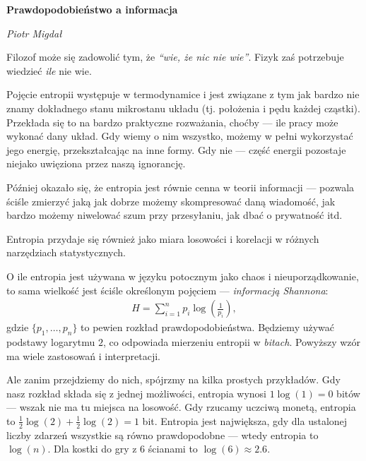 \documentclass[10pt,a4paper]{article}
\begin{document}
\noindent\textbf{\LARGE Prawdopodobieństwo a informacja}

\medskip
\noindent\textit{\Large Piotr Migdał}

\medskip

Filozof może się zadowolić tym, że \emph{``wie, że nic nie wie''}.
Fizyk zaś potrzebuje wiedzieć \emph{ile} nie wie.

Pojęcie entropii występuje w termodynamice i jest związane z tym jak bardzo nie znamy dokładnego stanu mikrostanu układu (tj. położenia i pędu każdej cząstki).
Przekłada się to na bardzo praktyczne rozważania, choćby --- ile pracy może wykonać dany układ. Gdy wiemy o nim wszystko, możemy w pełni wykorzystać jego energię, przekształcając na inne formy.
Gdy nie --- część energii pozostaje niejako uwięziona przez naszą ignorancję.

Później okazało się, że entropia jest równie cenna w teorii informacji --- pozwala ściśle zmierzyć jaką jak dobrze możemy skompresować daną wiadomość, jak bardzo możemy niwelować szum przy przesyłaniu, jak dbać o prywatność itd.

Entropia przydaje się również jako miara losowości i korelacji w różnych narzędziach statystycznych.


O ile entropia jest używana w języku potocznym jako chaos i nieuporządkowanie, to sama wielkość jest ściśle określonym pojęciem --- \emph{informacją Shannona}:
%
%
\begin{align}
    H = \sum_{i=1}^{n} p_i \log \left(\tfrac{1}{p_i} \right),\label{eq:entropia}
\end{align}
%
%
gdzie $\{p_1, \ldots, p_n\}$ to pewien rozkład prawdopodobieństwa.
Będziemy używać podstawy logarytmu $2$, co odpowiada mierzeniu entropii w \emph{bitach}.
Powyższy wzór ma wiele zastosowań i interpretacji.

Ale zanim przejdziemy do nich, spójrzmy na kilka prostych przykładów.
Gdy nasz rozkład składa się z jednej możliwości, entropia wynosi $1 \log(1) = 0$ bitów --- wszak nie ma tu miejsca na losowość.
Gdy rzucamy uczciwą monetą, entropia to $\tfrac{1}{2} \log(2) + \tfrac{1}{2} \log(2) = 1$ bit.
Entropia jest największa, gdy dla ustalonej liczby zdarzeń wszystkie są równo prawdopodobne --- wtedy entropia to $\log(n)$.
Dla kostki do gry z $6$ ścianami to $\log(6)\approx 2.6$.
\end{document}
